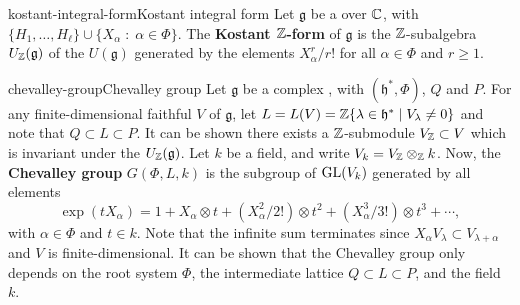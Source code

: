 \begin{topic}{kostant-integral-form}{Kostant integral form}
    Let $\mathfrak{g}$ be a   over $\mathbb{C}$, with  $\{ H_1, \ldots, H_\ell \} \cup \{ X_\alpha \;:\; \alpha \in \Phi \}$. The \textbf{Kostant $\mathbb{Z}$-form} of $\mathfrak{g}$ is the $\mathbb{Z}$-subalgebra $U_{\mathbb{Z}}(\mathfrak{g})$ of the  $U(\mathfrak{g})$ generated by the elements $X_\alpha^r / r!$ for all $\alpha \in \Phi$ and $r \ge 1$.
\end{topic}

\begin{topic}{chevalley-group}{Chevalley group}
    Let $\mathfrak{g}$ be a  complex , with  $(\mathfrak{h}^*, \Phi)$,  $Q$ and  $P$. For any finite-dimensional faithful  $V$ of $\mathfrak{g}$, let $L = L(V) = \mathbb{Z} \{ \lambda \in \mathfrak{h}^* \mid V_\lambda \ne 0 \}$ and note that $Q \subset L \subset P$. It can be shown there exists a $\mathbb{Z}$-submodule $V_{\mathbb{Z}} \subset V$ which is invariant under the  $U_{\mathbb{Z}}(\mathfrak{g})$. Let $k$ be a field, and write $V_k = V_{\mathbb{Z}} \otimes_{\mathbb{Z}} k$. Now, the \textbf{Chevalley group} $G(\Phi, L, k)$ is the subgroup of $\textup{GL}(V_k)$ generated by all elements
    \[ \exp(t X_\alpha) = 1 + X_\alpha \otimes t + (X_\alpha^2 / 2!) \otimes t^2 + (X_\alpha^3 / 3!) \otimes t^3 + \cdots , \]
    with $\alpha \in \Phi$ and $t \in k$. Note that the infinite sum terminates since $X_\alpha V_\lambda \subset V_{\lambda + \alpha}$ and $V$ is finite-dimensional. It can be shown that the Chevalley group only depends on the root system $\Phi$, the intermediate lattice $Q \subset L \subset P$, and the field $k$.
\end{topic}



